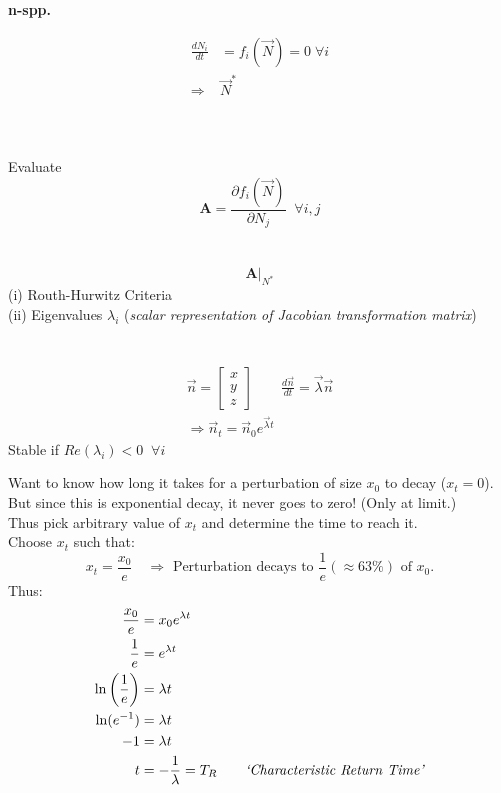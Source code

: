 \documentclass{article}
\newcommand{\ind}{\-\hspace{1cm}}
\begin{document}
\begin{minipage}[t]{0.3\textwidth}
	\begin{center}\textbf{n-spp.}\end{center}
	\begin{align*}\frac{dN_i}{dt}& =f_i(\vec{N})=0\; \forall i\\\Rightarrow & \vec{N}^*\end{align*}\\ \\ \\
	\ind Evaluate\\
	\begin{equation*} \mathbf{A}=\frac{\partial f_i(\vec{N})}{\partial N_j} \; \; \forall i,j	\end{equation*}\\ \\
	\begin{equation*} \mathbf{A}\vert_{N^*}	\end{equation*}
	 (i) Routh-Hurwitz Criteria\\
	 (ii) Eigenvalues $\lambda_i$ (\emph{scalar representation of Jacobian transformation matrix})\\ \\ \\ 
	 \begin{align*}
		 \vec{n}=\begin{bmatrix} x\\y\\z \end{bmatrix} \qquad \frac{d\vec{n}}{dt}=\vec{\lambda} \vec{n}\\
		 \Rightarrow \vec{n}_t=\vec{n}_0 e^{\vec{\lambda} t}
	 \end{align*}
	 	\ind Stable if $Re(\lambda_i) < 0 \; \; \forall i $
\end{minipage}
\vspace{2cm}

Want to know how long it takes for a perturbation of size $x_0$ to decay ($x_t=0$).\\
\ind But since this is exponential decay, it never goes to zero! (Only at limit.)\\

Thus pick arbitrary value of $x_t$ and determine the time to reach it.\\
\ind Choose $x_t$ such that:
\begin{equation*}
x_t = \frac{x_0}{e} \quad \Rightarrow \text{ Perturbation decays to } \frac{1}{e} (\approx 63\%) \text{ of } x_0.
\end{equation*}
Thus:
\begin{align*}
	\frac{x_0}{e}&=x_0 e^{\lambda t}\\
	\frac{1}{e} &= e^{\lambda t}\\
	\ln\left(\frac{1}{e}\right)&=\lambda t\\
	\ln(e^{-1})&=\lambda t\\
	-1 & = \lambda t\\
	t & = - \frac{1}{\lambda} = T_R \qquad \text{\emph{`Characteristic Return Time'}}
\end{align*}
\end{document}
